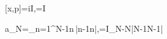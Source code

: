 [x,p]=i\hbar I,\qquad [a,a^\dagger]=I

a_N=\sum_{n=1}^{N-1}\sqrt n\,|n-1\rangle\langle n|,\qquad [a_N,a_N^\dagger]=I_N-N|N-1\rangle\langle N-1|
